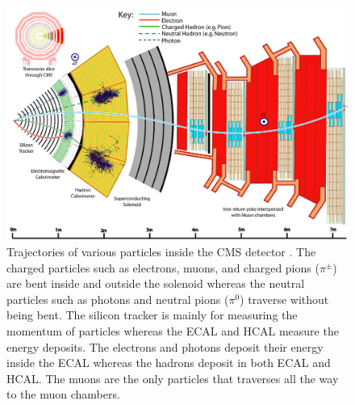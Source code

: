 \begin{figure}
  \begin{center}
  \includegraphics[width=0.90\linewidth]{Experiment/CMS/Image/cmstrack.png}
	  \caption{Trajectories of various particles inside the CMS detector 
	  \cite{Sirunyan:2270046}. The charged particles
	  such as electrons, muons, and charged pions ($\pi^\pm$) are bent inside and 
	  outside the
	  solenoid whereas the neutral particles such as photons and neutral pions ($\pi^0$)
	  traverse without being bent. The silicon tracker is mainly for measuring
	  the momentum of particles whereas the ECAL and HCAL measure the 
	  energy deposits. The electrons and photons deposit their energy inside the 
	  ECAL whereas the hadrons deposit in both ECAL and HCAL. The muons are the
	  only particles that traverses all the way to the muon chambers.}
  \label{fig:cms_track}
  \end{center}
\end{figure}
